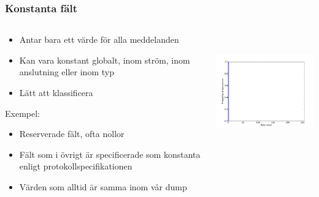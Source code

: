 \documentclass[xetex, 8pt]{beamer}
\begin{document}
    \begin{frame}
        \frametitle{Konstanta fält}
        \begin{columns}[t]
            \begin{column}[T]{6cm}
                \begin{itemize}
                    \item Antar bara ett värde för alla meddelanden
                    \item Kan vara konstant globalt, inom ström, inom
                        anslutning eller inom typ
                    \item Lätt att klassificera
                \end{itemize}
                Exempel:
                \begin{itemize}
                    \item Reserverade fält, ofta nollor
                    \item Fält som i övrigt är specificerade som konstanta
                        enligt protokollspecifikationen
                    \item Värden som alltid är samma inom vår dump
                \end{itemize}
            \end{column}
            \begin{column}[T]{6cm}
                \includegraphics[height=5cm]{img/const_one.pdf}
            \end{column}
        \end{columns}
    \end{frame}
\end{document}
